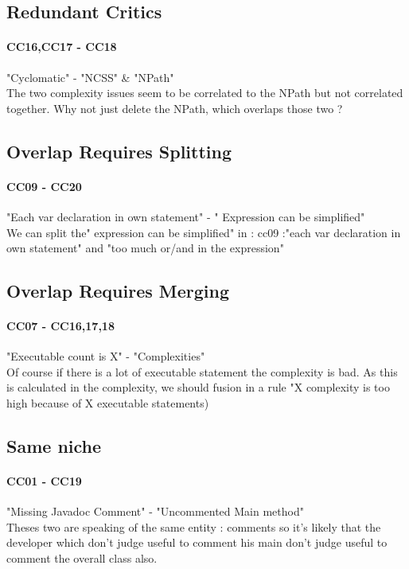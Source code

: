 \documentclass{article}
\begin{document}
\subsection{Redundant Critics}
\paragraph{CC16,CC17 - CC18 }
 "Cyclomatic" - "NCSS" \& "NPath" \\
The two complexity issues seem to be correlated to the NPath but not correlated together. Why not just delete the NPath, which overlaps those two ?

\subsection{Overlap Requires Splitting}
\paragraph{CC09  - CC20}
"Each var declaration in own statement" - " Expression can be simplified" \\
We can split the" expression can be simplified" in : cc09 :"each var declaration in own statement" and "too much or/and in the expression" 

\subsection{Overlap Requires Merging}
\paragraph{CC07 - CC16,17,18}
"Executable count is X" -  "Complexities"\\
Of course if there is a lot of executable statement the complexity is bad. As this is calculated in the complexity, we should fusion in a rule "X complexity is too high because of X executable statements) 





\subsection{Same niche}
\paragraph{CC01 - CC19} 
 "Missing Javadoc Comment" - "Uncommented Main method" \\
Theses two are speaking of the same entity : comments so it's likely that the developer which don't judge useful to comment his main don't judge useful to comment the overall class also.
\end{document}

